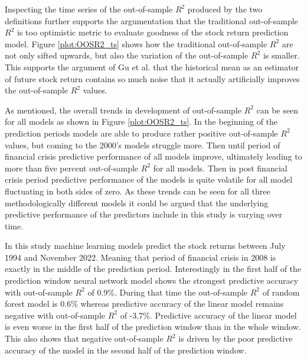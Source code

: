 \documentclass{article}
\begin{document}
Inspecting the time series of the out-of-sample $R^2$ produced by the two definitions further supports the argumentation that the traditional out-of-sample $R^2$ is too optimistic metric to evaluate goodness of the stock return prediction model. Figure \ref{plot:OOSR2_ts} shows how the traditional out-of-sample $R^2$ are not only sifted upwards, but also the variation of the out-of-sample $R^2$ is smaller. This supports the argument of Gu et al. \citeyear{guetal} that the historical mean as an estimator of future stock return contains so much noise that it actually artificially improves the out-of-sample $R^2$ values. \par

As mentioned, the overall trends in development of out-of-sample $R^2$ can be seen for all models as shown in Figure \ref{plot:OOSR2_ts}. In the beginning of the prediction periods models are able to produce rather positive out-of-sample $R^2$ values, but coming to the 2000's models struggle more. Then until period of financial crisis predictive performance of all models improve, ultimately leading to more than five percent out-of-sample $R^2$ for all models. Then in post financial crisis period predictive performance of the models is quite volatile for all model fluctuating in both sides of zero. As these trends can be seen for all three methodologically different models it could be argued that the underlying predictive performance of the predictors include in this study is varying over time. \par

In this study machine learning models predict the stock returns between July 1994 and November 2022. Meaning that period of financial crisis in 2008 is exactly in the middle of the prediction period. Interestingly in the first half of the prediction window neural network model shows the strongest predictive accuracy with out-of-sample $R^2$ of 0.9\%. During that time the out-of-sample $R^2$ of random forest model is 0.6\% whereas predictive accuracy of the linear model remains negative with out-of-sample $R^2$ of -3.7\%. Predictive accuracy of the linear model is even worse in the first half of the prediction window than in the whole window. This also shows that negative out-of-sample $R^2$ is driven by the poor predictive accuracy of the model in the second half of the prediction window. \par
\end{document}

